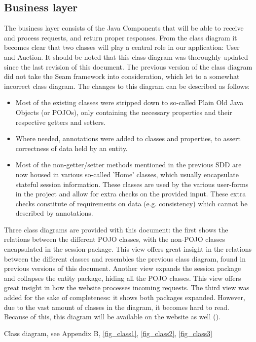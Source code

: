 \documentclass[salesmen, twoside]{../../../templates/latex/2009/softproj}
\begin{document}
\begin{projdoc}
\section{Business layer}
The business layer consists of the Java Components that will be able to receive and process requests, and return proper responses.
From the class diagram it becomes clear that two classes will play a central role in our application: User and Auction. It should be noted that this class diagram was thoroughly updated since the last revision of this document. The previous version of the class diagram did not take the Seam framework into consideration, which let to a somewhat incorrect class diagram. The changes to this diagram can be described as follows:
\begin{itemize}
\item Most of the existing classes were stripped down to so-called Plain Old Java Objects (or POJOs), only containing the necessary properties and their respective getters and setters.
\item Where needed, annotations were added to classes and properties, to assert correctness of data held by an entity.
\item Most of the non-getter/setter methods mentioned in the previous SDD are now housed in various so-called 'Home' classes, which usually encapsulate stateful session information. These classes are used by the various user-forms in the project and allow for extra checks on the provided input. These extra checks constitute of requirements on data (e.g. consistency) which cannot be described by annotations.
\end{itemize}

Three class diagrams are provided with this document: the first shows the relations between the different POJO classes, with the non-POJO classes encapsulated in the session-package. This view offers great insight in the relations between the different classes and resembles the previous class diagram, found in previous versions of this document. Another view expands the session package and collapses the entity package, hiding all the POJO classes. This view offers great insight in how the website processes incoming requests. The third view was added for the sake of completeness: it shows both packages expanded. However, due to the vast amount of classes in the diagram, it becomes hard to read. Because of this, this diagram will be available on the website as well (\cite{SDD_full_class_diagram}).

Class diagram, see Appendix B, \ref{fig_class1}, \ref{fig_class2}, \ref{fig_class3}


\end{projdoc}
\end{document}
